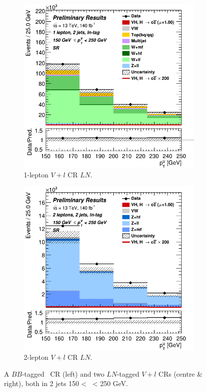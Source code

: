 \begin{figure}[h!]
\begin{subfigure}[b]{0.32\textwidth}
      \includegraphics[width=\textwidth]{Images/VH/Own_fit/prefit_VHcc/Region_distpTV_BMax250_BMin150_DSR_J2_TTypeln_T1_L1_Y6051_Prefit.png}
      \caption{1-lepton $V+l$ CR $LN$.}
      \label{fig:plots_VHcc_ex_1L_CRvl}
  \end{subfigure}
  \begin{subfigure}[b]{0.32\textwidth}
    \centering
    \includegraphics[width=\textwidth]{Images/VH/Own_fit/prefit_VHcc/Region_distpTV_BMax250_BMin150_DSR_J2_TTypeln_T1_L2_Y6051_Prefit.png}
    \caption{2-lepton $V+l$ CR $LN$.}
    \label{fig:plots_VHcc_ex_2L_CRvl}
\end{subfigure}
  \caption{A $BB$-tagged \lowdr\ CR (left) and two $LN$-tagged $V+l$ CRs (centre \& right), both in 2 jets 150 < \ptv\ < 250 GeV.}
  \label{fig:plots_VH_ex_CRL_CRvl}
\end{figure} 


